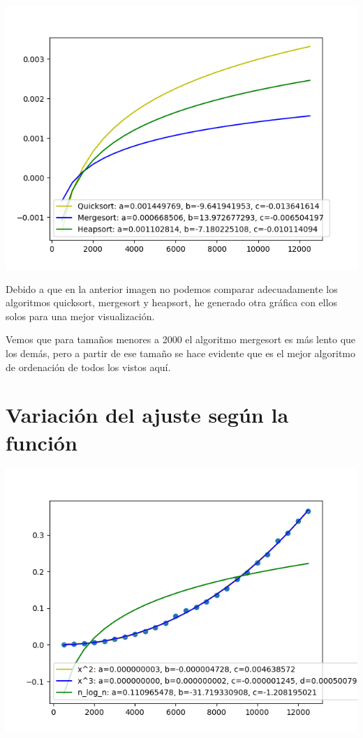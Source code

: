 \documentclass[12pt]{article}
\begin{document}
\begin{center}
\includegraphics[scale=0.5]{../graficos/ordenacion/ordenacion_sort_only.png}
\end{center}

Debido a que en la anterior imagen no podemos comparar adecuadamente los algoritmos quicksort, mergesort y heapsort, he generado otra gráfica con ellos solos para una mejor visualización. 

Vemos que para tamaños menores a 2000 el algoritmo mergesort es más lento que los demás, pero a partir de ese tamaño se hace evidente que es el mejor algoritmo de ordenación de todos los vistos aquí.

\section{Variación del ajuste según la función}

\includegraphics[scale=0.9]{../graficos/ordenacion/ajuste.png}
\end{document}
